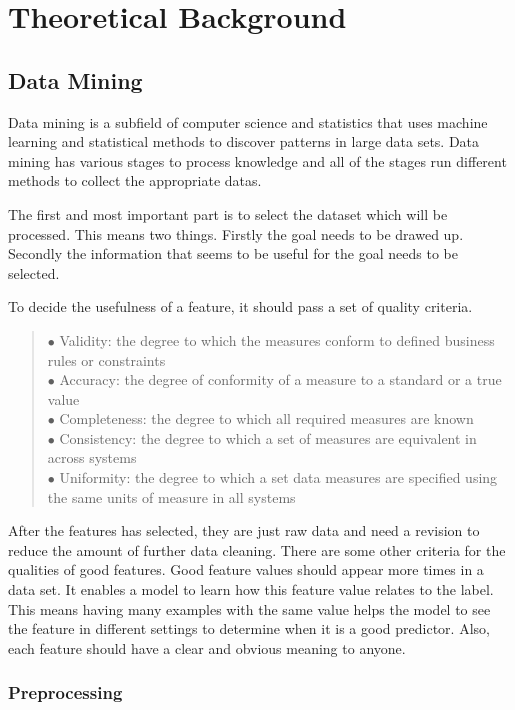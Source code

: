\chapter{Theoretical Background}

\section{Data Mining}

Data mining is a subfield of computer science and statistics that uses machine learning and statistical methods to discover patterns in large data sets. Data mining has various stages to process knowledge and all of the stages run different methods to collect the appropriate datas.\medskip

The first and most important part is to select the dataset which will be processed. This means two things. Firstly the goal needs to be drawed up. Secondly the information that seems to be useful for the goal needs to be selected. \medskip

\noindent To decide the usefulness of a feature, it should pass a set of quality criteria.
\begin{verse}
	$\bullet$ Validity: the degree to which the measures conform to defined business rules or constraints\\
	$\bullet$ Accuracy: the degree of conformity of a measure to a standard or a true value\\
	$\bullet$ Completeness: the degree to which all required measures are known\\
	$\bullet$ Consistency: the degree to which a set of measures are equivalent in across systems\\
	$\bullet$ Uniformity: the degree to which a set data measures are specified using the same units of measure in all systems
\end{verse}

After the features has selected, they are just raw data and need a revision to reduce the amount of further data cleaning. There are some other criteria for the qualities of good features. Good feature values should appear more times in a data set. It enables a model to learn how this feature value relates to the label. This means having many examples with the same value helps the model to see the feature in different settings to determine when it is a good predictor. Also, each feature should have a clear and obvious meaning to anyone. 


\subsection{Preprocessing}

